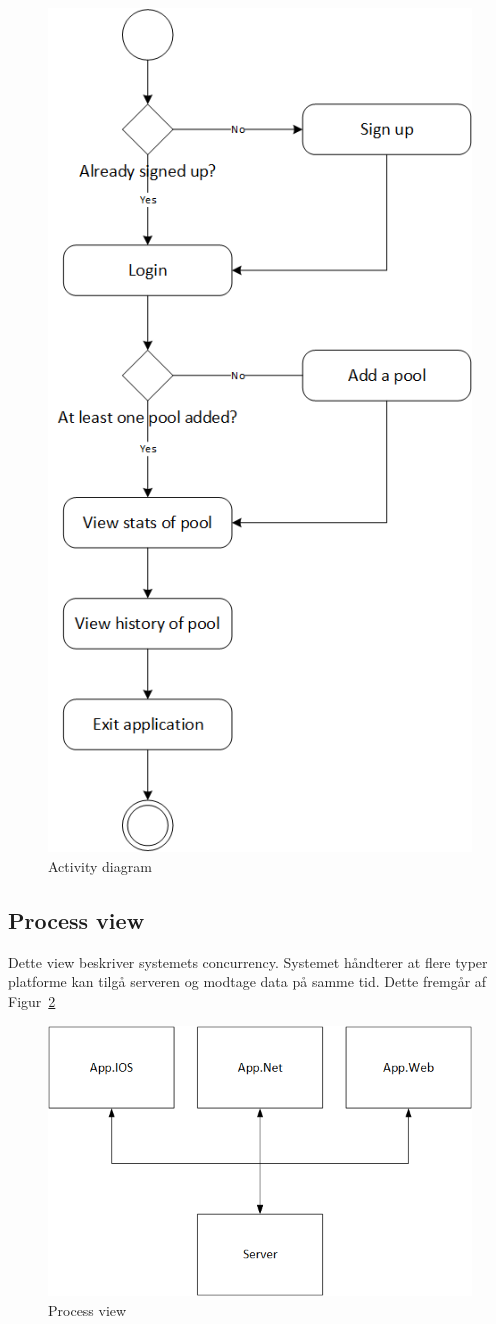 \begin{figure}
\centering
\includegraphics[width=0.55\linewidth]{figs/arkitektur/ActivityDiagram.PNG}
\caption{Activity diagram}
\label{fig:ActivityDiagram}
\end{figure}

\subsection{Process view}
Dette view beskriver systemets concurrency. Systemet håndterer at flere typer platforme kan tilgå serveren og modtage data på samme tid. Dette fremgår af Figur~\ref{fig:processview}
\begin{figure}
\centering
\includegraphics[width=0.7\linewidth]{figs/arkitektur/Processview.png}
\caption{Process view}
\label{fig:processview}
\end{figure}

